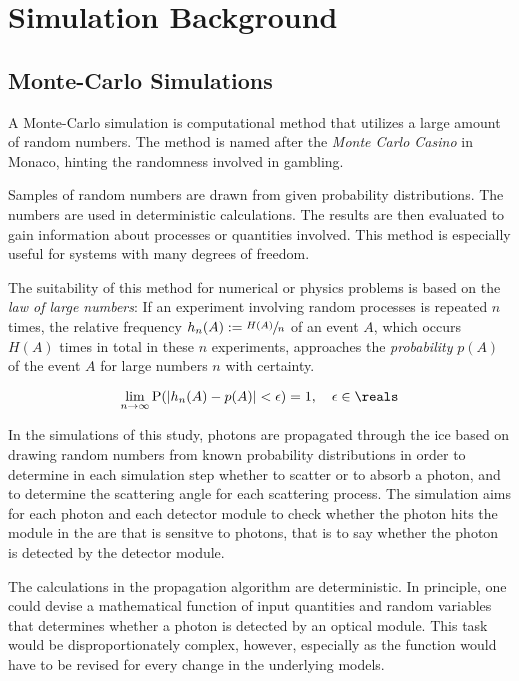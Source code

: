 
\section{Simulation Background}
\label{sec:simulation_background}

\subsection{Monte-Carlo Simulations}
\label{sec:monte_carlo}


A Monte-Carlo simulation is computational method that utilizes a large amount of random numbers. The method is named after the \textit{Monte Carlo Casino} in Monaco, hinting the randomness involved in gambling. \cite{physiklexikon}

Samples of random numbers are drawn from given probability distributions. The numbers are used in deterministic calculations. The results are then evaluated to gain information about processes or quantities involved. This method is especially useful for systems with many degrees of freedom. \cite{physiklexikon}

The suitability of this method for numerical or physics problems is based on the \textit{law of large numbers}: If an experiment involving random processes is repeated $n$ times, the relative frequency $h_n(A):=\sfrac{H(A)}{n}$ of an event $A$, which occurs $H(A)$ times in total in these $n$ experiments, approaches the \textit{probability} $p(A)$ of the event $A$ for large numbers $n$ with certainty. \cite{physiklexikon}

$$
  \lim_{n \rightarrow \infty} \text{P}(|h_n(A) - p(A)| < \epsilon) = 1, \ \ \ \epsilon \in \reals
$$

In the simulations of this study, photons are propagated through the ice based on drawing random numbers from known probability distributions in order to determine in each simulation step whether to scatter or to absorb a photon, and to determine the scattering angle for each scattering process. The simulation aims for each photon and each detector module to check whether the photon hits the module in the are that is sensitve to photons, that is to say whether the photon is detected by the detector module.

The calculations in the propagation algorithm are deterministic. In principle, one could devise a mathematical function of input quantities and random variables that determines whether a photon is detected by an optical module. This task would be disproportionately complex, however, especially as the function would have to be revised for every change in the underlying models.

